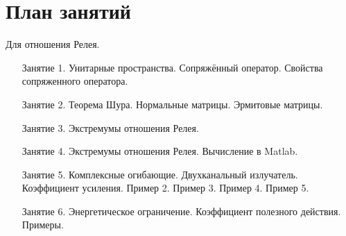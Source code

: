 \chapter{План занятий}

Для отношения Релея.
\begin{itemize}
    \item[Занятие 1.] Унитарные пространства. Сопряжённый оператор. Свойства сопряженного оператора.
    \item[Занятие 2.] Теорема Шура. Нормальные матрицы. Эрмитовые матрицы.
    \item[Занятие 3.] Экстремумы отношения Релея.
    \item[Занятие 4.] Экстремумы отношения Релея. Вычисление в Matlab.
    \item[Занятие 5.] Комплексные огибающие. Двухканальный излучатель. Коэффициент усиления. Пример 2. Пример 3. Пример 4. Пример 5.
    \item[Занятие 6.] Энергетическое ограничение. Коэффициент полезного действия. Примеры.
\end{itemize}
